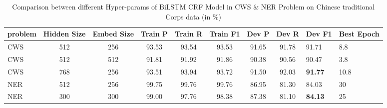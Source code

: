 \begin{table*}[htbp!]
    \centering
    \begin{tabular}{lccccccc}
    \midrule
    problem & Hidden Size  &  Embed Size  & Train P   &Train R     & Train F1       & Dev P      & Dev R & Dev F1 &Best Epoch\\
    \midrule
   
    CWS& 512         & 256        & 93.53   & 93.54   & 93.53    & 91.65 & 91.78 & 91.71     & 8.8        \\
    CWS& 512         & 512        & 91.81   & 91.92   & 91.86    & 90.38 & 90.56 & 90.47     & 3.8        \\
    CWS& 768         & 256        & 93.51   & 93.94   & 93.72    & 91.50 & 92.03 & \bf91.77  & 10.8       \\
    NER& 512         & 256        & 99.75   & 99.76   & 99.76    & 86.95 & 81.30 & 84.03     & 30         \\
    NER& 300         & 300        & 99.00   & 97.76   & 98.38    & 87.38 & 81.10 & \bf84.13  & 25         \\

    \bottomrule
    \end{tabular}
\caption{Comparison between different Hyper-params of BiLSTM CRF Model in CWS \& NER Problem on Chinese traditional Corps data (in \%)}
\label{tab:batchSize}
\end{table*}
